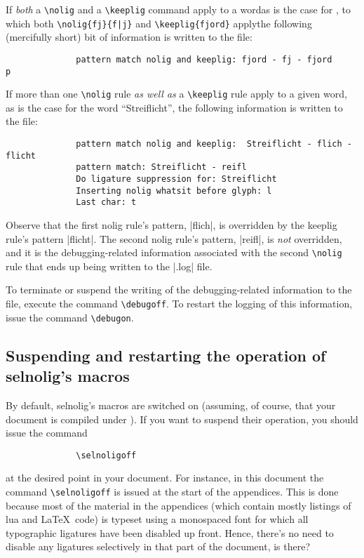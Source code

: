 \documentclass[11pt]{article}
\newcommand{\pkg}[1]{\textsf{#1}}
\newcommand{\opt}[1]{\uselig{\texttt{#1}}}
\newcommand{\cmmd}[1]{\texttt{\textbackslash #1}}
\begin{document}
If \emph{both} a \cmmd{nolig} and a \cmmd{keeplig} command apply to a word\textemdash as is the case for \opt{fjord}, to which both \Verb+\nolig{fj}{f|j}+ and \Verb+\keeplig{fjord}+ apply\textemdash the following (mercifully short) bit of information is written to the \opt{.log} file:
\begin{Verbatim}
              pattern match nolig and keeplig: fjord - fj - fjord
p\end{Verbatim}

If more than one \cmmd{nolig} rule \emph{as well as} a \cmmd{keeplig} rule apply to a given word, as is the case for the word \enquote{Streiflicht}, the following information is written to the \opt{.log} file:
\begin{Verbatim}
              pattern match nolig and keeplig:  Streiflicht - flich - flicht
              pattern match: Streiflicht - reifl
              Do ligature suppression for: Streiflicht
              Inserting nolig whatsit before glyph: l
              Last char: t
\end{Verbatim}

Observe that the first nolig rule's pattern, |flich|, is overridden by the keeplig rule's pattern |flicht|. The second nolig rule's pattern, |reifl|, is \emph{not} overridden, and it is the debugging-related information associated with the second \cmmd{nolig} rule that ends up being written to the |.log| file. 

To terminate or suspend the writing of the debugging-related information to the \opt{.log} file, execute the command \cmmd{debugoff}. To restart the logging of this information, issue the command \cmmd{debugon}.



\subsection[Suspending and restarting the operation of selnolig's macros]{Suspending and restarting the operation of \pkg{selnolig}'s macros} \label{sec:selnoligon}

By default, \pkg{selnolig}'s macros are switched on (assuming, of course, that your document is compiled under \LuaLaTeX). If you want to suspend their operation, you should issue the command
\begin{Verbatim}
              \selnoligoff
\end{Verbatim}
at the desired point in your document. For instance, in this document the command \cmmd{selnoligoff} is issued at the start of the appendices. This is done because most of the material in the appendices (which contain mostly listings of lua and \LaTeX\ code) is typeset using a monospaced font for which all typographic ligatures have been disabled up front. Hence, there's no need to disable any ligatures selectively in that part of the document, is there?
\end{document}
